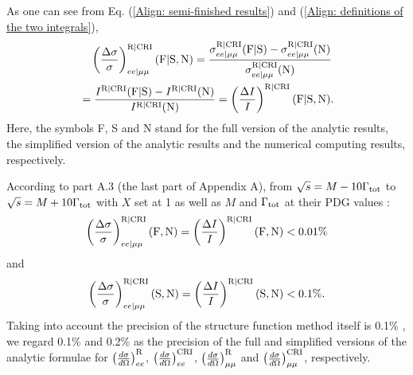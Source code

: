 \documentclass[a4paper,10pt,twoside]{cpc-hepnp}
\newcommand{\Tw}{\Gamma_{\rm tot}}
\begin{document}
\begin{CJK*}{UTF8}{gbsn}
\begin{multicols}{2}
	As one can see from Eq. (\ref{Align: semi-finished results}) and (\ref{Align: definitions of the two integrals}),
	\begin{align*}
		& \ \ \  \left(\frac{\Delta \sigma}{\sigma}\right)_{ee|\mu\mu}^{\rm R|CRI}(\text{F}|\text{S},\text{N}) = \frac{\sigma_{ee|\mu\mu}^{\rm R|CRI}(\text{F}|\text{S})-\sigma_{ee|\mu\mu}^{\rm R|CRI}(\text{N})}{\sigma_{ee|\mu\mu}^{\rm R|CRI}(\text{N})} \\
		& = \frac{I^{\rm R|CRI}(\text{F}|\text{S})-I^{\rm R|CRI}(\text{N})}{I^{\rm R|CRI}(\text{N})} = \left(\frac{\Delta I}{I}\right)^{\rm R|CRI}(\text{F}|\text{S},\text{N}).
	\end{align*}
	\noindent Here, the symbols F, S and N stand for the full version of the analytic results, the simplified version of the analytic results and the numerical computing results, respectively.
	
	According to part A.3 (the last part of Appendix A), from $\sqrt{s}=M-10\Tw$ to $\sqrt{s}=M+10\Tw$ with $X$ set at 1 as well as $M$ and $\Tw$ at their PDG values \cite{PDG2016}:
	\begin{equation*}
		\left(\frac{\Delta \sigma}{\sigma}\right)_{ee|\mu\mu}^{\rm R|CRI}(\text{F},\text{N}) = \left(\frac{\Delta I}{I}\right)^{\rm R|CRI}(\text{F},\text{N})<0.01\%
	\end{equation*}
	and
	\begin{equation*}
		\left(\frac{\Delta \sigma}{\sigma}\right)_{ee|\mu\mu}^{\rm R|CRI}(\text{S},\text{N}) = \left(\frac{\Delta I}{I}\right)^{\rm R|CRI}(\text{S},\text{N})<0.1\%.
	\end{equation*}
	Taking into account the precision of the structure function method itself is 0.1\% \cite{STRUCTUREFUNCTIONMETHOD}, we regard 0.1\% and 0.2\% as the precision of the full and simplified versions of the analytic formulae for $\left(\frac{d\sigma}{d\Omega}\right)_{ee}^{\rm R}$, $\left(\frac{d\sigma}{d\Omega}\right)_{ee}^{\rm CRI}$, $\left(\frac{d\sigma}{d\Omega}\right)_{\mu\mu}^{\rm R}$ and $\left(\frac{d\sigma}{d\Omega}\right)_{\mu\mu}^{\rm CRI}$, respectively.




\end{multicols}
\end{CJK*}
\end{document}

